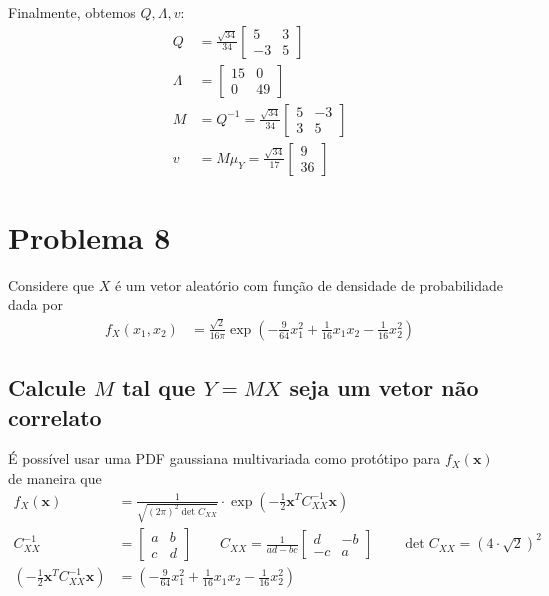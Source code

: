 \documentclass{article}
\begin{document}
Finalmente, obtemos $Q, \Lambda, v$:
\begin{align*}
    Q &= \frac{\sqrt{34}}{34} \begin{bmatrix} 5&3\\-3&5 \end{bmatrix} \\
    \Lambda &= \begin{bmatrix} 15&0\\0&49 \end{bmatrix} \\
    M &= Q^{-1} = \frac{\sqrt{34}}{34} \begin{bmatrix} 5&-3\\3&5 \end{bmatrix} \\
v &= M\mu_Y = \frac{\sqrt{34}}{17} \begin{bmatrix} 9\\36 \end{bmatrix}
\end{align*}

\section{Problema 8}
Considere que $X$ é um vetor aleatório com função de densidade de probabilidade dada por
\begin{align*}
    f_X(x_1, x_2) &= \frac{\sqrt{2}}{16\pi} \exp{\left(-\frac{9}{64}x_1^2+\frac{1}{16}x_1x_2-\frac{1}{16}x_2^2\right)}
\end{align*}

\subsection{Calcule $M$ tal que $Y = MX$ seja um vetor não correlato}
É possível usar uma PDF gaussiana multivariada como protótipo para $f_X(\mathbf{x})$ de maneira que
\begin{align*}
    f_X(\mathbf{x}) &= \frac{1}{\sqrt{(2\pi)^2 \det{C_{XX}}}} \cdot \exp{\left(-\frac{1}{2}\mathbf{x}^T C_{XX}^{-1} \mathbf{x}\right)} \\
C_{XX}^{-1} &= \begin{bmatrix} a&b\\c&d \end{bmatrix} \qquad
C_{XX} = \frac{1}{ad-bc} \begin{bmatrix} d&-b\\-c&a \end{bmatrix} \qquad \det{C_{XX}} = (4\cdot\sqrt{2})^2 \\
\left(-\frac{1}{2}\mathbf{x}^T C_{XX}^{-1} \mathbf{x}\right) &= \left(-\frac{9}{64}x_1^2+\frac{1}{16}x_1x_2-\frac{1}{16}x_2^2\right)
\end{align*}
\end{document}

